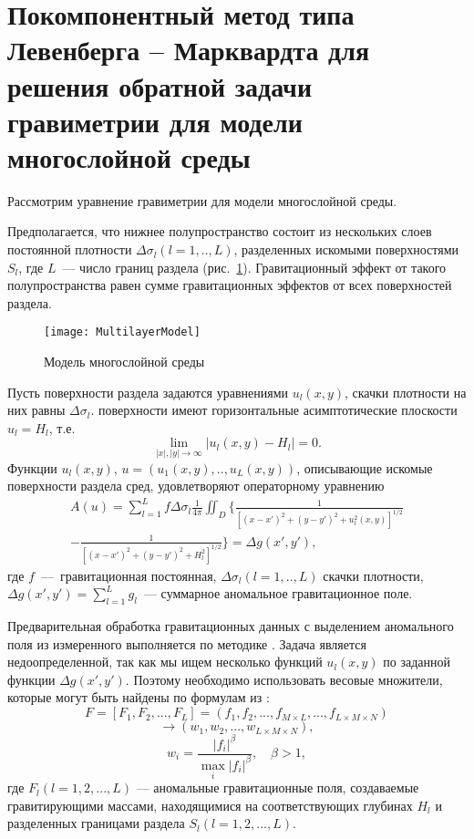 \newpage
\section{Покомпонентный метод типа Левенберга -- Марквардта для решения обратной задачи гравиметрии для модели многослойной среды}

Рассмотрим уравнение гравиметрии для модели многослойной среды. 

Предполагается, что нижнее полупространство состоит из нескольких слоев постоянной плотности $\Delta\sigma_l(l=1,..,L)$, разделенных искомыми поверхностями $S_l$, где $L$~--- число границ раздела (рис.~\ref{fig:multlayer}). Гравитационный эффект от такого полупространства равен сумме гравитационных эффектов от всех поверхностей раздела.
\begin{figure}[h]
	\centering
	\texttt{[image: MultilayerModel]}
	\caption{Модель многослойной среды}
	\label{fig:multlayer}
\end{figure}
Пусть поверхности раздела задаются уравнениями $u_l(x,y)$, скачки плотности на них равны $\Delta\sigma_l$. поверхности имеют горизонтальные асимптотические плоскости $u_l=H_l$, т.е. $$\lim_{|x|,|y|\to\infty}|u_l(x,y)-H_l|=0.$$ Функции $u_l(x,y)$, $u=(u_1(x,y), .., u_L(x,y))$, описывающие искомые поверхности раздела сред, удовлетворяют операторному уравнению
\begin{equation}\label{equ_grav}
\begin{aligned}
A(u)=\sum_{l=1}^{L}f\Delta\sigma_l\frac{1}{4\pi}\iint_D\bigg\{\frac{1}{[(x-x')^2+(y-y')^2+u_l^2(x,y)]^{1/2}} \\
-\frac{1}{[(x-x')^2+(y-y')^2+H_l^2]^{1/2}}\bigg\}=\Delta g(x',y'),
\end{aligned}
\end{equation}
где $f$~---~гравитационная постоянная, $\Delta\sigma_l(l=1,..,L)$ скачки плотности, $\Delta g(x',y')=\sum_{l=1}^{L}g_l$~--- суммарное аномальное гравитационное поле. 

Предварительная обработка гравитационных данных с выделением аномального поля из измеренного выполняется по методике  \cite{MarPrut2003}. Задача является недоопределенной, так как мы ищем несколько функций $u_l(x,y)$ по заданной функции $\Delta g(x',y')$. Поэтому необходимо использовать весовые множители, которые могут быть найдены по формулам из \cite{AkMarMis2013}:
$$F=[F_1, F_2, ..., F_L]=(f_1, f_2, ..., f_{M\times L}, ..., f_{L\times M\times N})$$
$$\to (w_1, w_2, ..., w_{L\times M\times N}),$$
\begin{equation}\label{weght_fact_formula}
w_i=\frac{|f_i|^\beta}{\max\limits_{i} |f_i|^\beta}, \quad \beta>1,
\end{equation}
где $F_l (l=1, 2, ..., L)$ --- аномальные гравитационные поля, создаваемые гравитирующими массами, находящимися на соответствующих глубинах $H_l$ и разделенных границами раздела $S_l(l=1, 2, ..., L)$.

